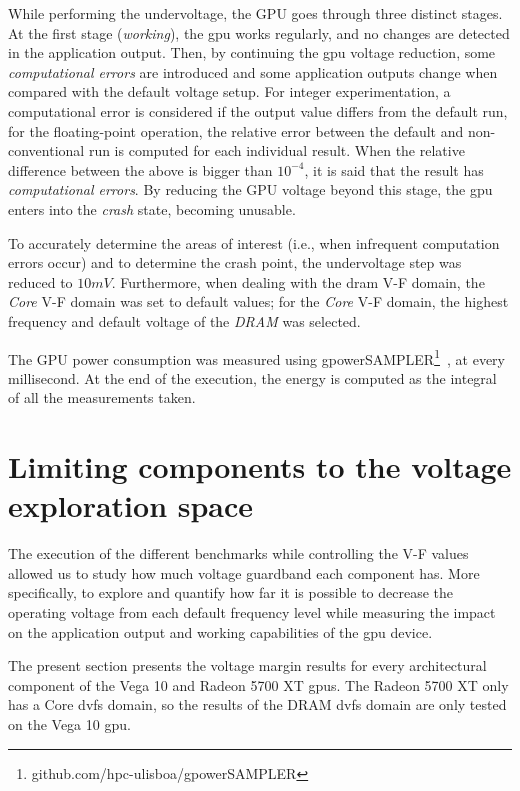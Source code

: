 While performing the undervoltage, the GPU goes through three distinct stages. At the first stage (\textit{working}), the \acrshort{gpu} works regularly, and no changes are detected in the application output. Then, by continuing the \acrshort{gpu} voltage reduction, some \textit{computational errors} are introduced and some application outputs change when compared with the default voltage setup. For integer experimentation, a computational error is considered if the output value differs from the default run, for the floating-point operation, the relative error between the default and non-conventional run is computed for each individual result. When the relative difference between the above is bigger than $10^{-4}$, it is said that the result has \textit{computational errors}.
By reducing the GPU voltage beyond this stage, the \acrshort{gpu} enters into the \textit{crash} state, becoming unusable.

To accurately determine the areas of interest (i.e., when infrequent computation errors occur) and to determine the crash point, the undervoltage step was reduced to $10mV$. Furthermore, when dealing with the \acrshort{dram} V-F domain, the \textit{Core} V-F domain was set to default values; for the \textit{Core} V-F domain, the highest frequency and default voltage of the \textit{DRAM} was selected. 

The GPU power consumption was measured using gpowerSAMPLER\footnote{github.com/hpc-ulisboa/gpowerSAMPLER}~\cite{guerreiro_gpgpu_2018}, at every millisecond. At the end of the execution, the energy is computed as the integral of all the measurements taken. 

\section{Limiting components to the voltage exploration space}
\label{sec:limiting_components}

The execution of the different benchmarks while controlling the V-F values allowed us to study how much voltage guardband each component has. More specifically, to explore and quantify how far it is possible to decrease the operating voltage from each default frequency level while measuring the impact on the application output and working capabilities of the \acrshort{gpu} device. 


The present section presents the voltage margin results for every architectural component of the Vega 10 and Radeon 5700 XT \acrshort{gpu}s. The Radeon 5700 XT only has a Core \acrshort{dvfs} domain, so the results of the DRAM \acrshort{dvfs} domain are only tested on the Vega 10 \acrshort{gpu}.



